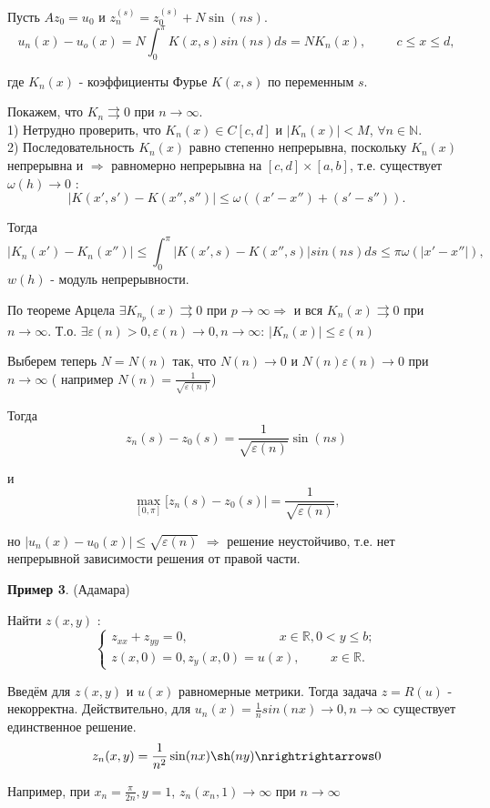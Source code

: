 \documentclass{article}
\begin{document}
Пусть $Az_0 = u_0$ и $z_n^{(s)} = z_0^{(s)} + N \sin (ns)$.
\begin{equation*}
	u_n(x) - u_o(x) = N \int_0^{\pi} K(x,s) sin(ns) ds = N K_n(x),  \hspace{1cm} c \leqslant x \leqslant d,  
\end{equation*}

где $K_n(x)$ - коэффициенты Фурье $K(x,s)$ по переменным $s$.

Покажем, что $K_n \rightrightarrows 0$ при $n \rightarrow \infty $.\\
1) Нетрудно проверить, что $K_n(x) \in C[c,d]$ и $|K_n(x)| < M$, $\forall n \in \mathbb{N}$.\\
2) Последовательность $K_n(x)$ равно степенно непрерывна, поскольку $K_n(x)$ непрерывна и $\Rightarrow$ равномерно непрерывна на $[c,d] \times [a,b]$, 
т.е. существует $ \omega(h) \rightarrow 0 $ : 
$$
	|K(x',s') - K(x'',s'')| \leqslant \omega ((x' - x'') + (s' - s'')).
$$ 

Тогда 
$$
	|K_n(x') - K_n(x'')| \leqslant \int_0^{\pi} |K(x',s) - K(x'',s)| sin (ns) ds \leqslant \pi \omega (|x' - x''|),
$$
$w(h)$ - модуль непрерывности.

По теореме Арцела 
$\exists K_{n_p}(x) \rightrightarrows 0$ при $p \rightarrow \infty \Rightarrow$
и вся $K_n(x) \rightrightarrows 0$ при $n \rightarrow \infty $.
Т.о. $\exists \varepsilon(n) > 0, \varepsilon (n) \rightarrow 0, n \rightarrow \infty $: $|K_n(x)| \leqslant \varepsilon(n)$

Выберем теперь $N = N(n)$ так, что $N(n) \rightarrow 0$ и $N(n)\varepsilon(n) \rightarrow 0$ при $n \rightarrow \infty $ ( например $N(n) = \frac{1}{\sqrt{\varepsilon (n)}}$)

Тогда 
$$
	z_n(s) - z_0(s) = \frac{1}{\sqrt{\varepsilon (n)}} \sin(ns)
$$

и 
$$
	\max_{[0,\pi]}[z_n(s) - z_0(s)| = \frac{1}{\sqrt{\varepsilon (n)}},
$$

но $|u_n(x) - u_0(x)| \leqslant \sqrt{\varepsilon (n)}$ $\Rightarrow$ решение неустойчиво, т.е. нет непрерывной зависимости решения от правой части.

\textbf{Пример 3}. (Адамара)

Найти $z(x,y)$ : 
$$
\begin{cases} 
	z_{xx} + z_{yy} = 0, \hspace{3cm} x \in \mathbb{R}, 0 < y \leqslant b;\\
	z(x,0)=0, z_y(x,0) = u(x), \hspace{1cm} x \in \mathbb{R}.
\end{cases}
$$

Введём для $z(x,y)$ и $u(x)$ равномерные метрики. 
Тогда задача $z = R(u)$ - некорректна. 
Действительно, для $ u_n(x) = \frac{1}{n} sin(nx) \rightarrow 0, n \rightarrow \infty $ существует единственное решение.
$$
	z_n(x,y) = \frac{1}{n^2} \sin(nx) \sh(ny) \nrightrightarrows 0
$$

Например, при $x_n = \frac{\pi}{2n}, y =1$, $z_n(x_n, 1) \rightarrow \infty $ при $n \rightarrow \infty $
\end{document}
